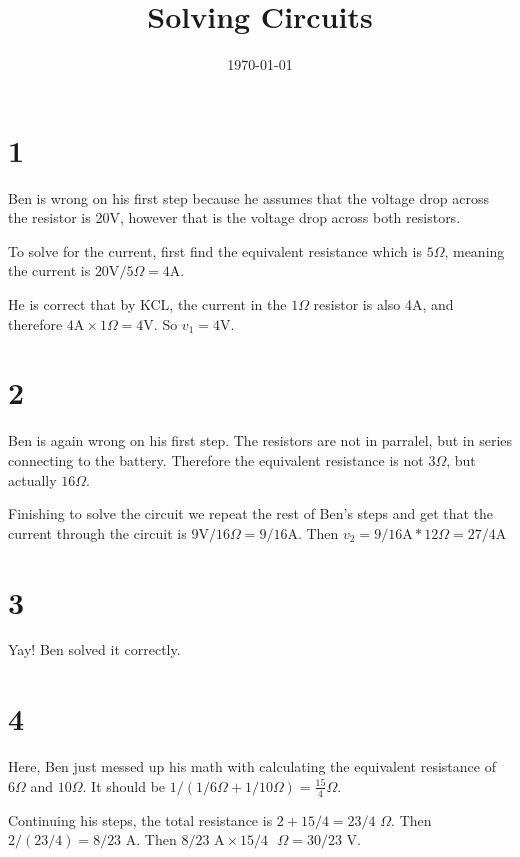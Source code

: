 \documentclass{article}
\begin{document}
\title{Solving Circuits}
\author{}
\date{\today}

\maketitle

\section*{1}

\noindent Ben is wrong on his first step because he assumes that the voltage
drop across the resistor is 20V, however that is the voltage drop
across both resistors.

\noindent To solve for the current, first find the equivalent resistance
which is $5\Omega$, meaning the current is $\text{20V}/ 5\Omega = \text{4A}$.

\noindent He is correct that by KCL, the current in the $1\Omega$ resistor is also
4A, and therefore $\text{4A}\times1\Omega=\text{4V}$. So $v_1=\text{4V}$.

\section*{2}

\noindent Ben is again wrong on his first step. The resistors are not in parralel,
but in series connecting to the battery. Therefore the equivalent resistance is not
$3\Omega$, but actually $16\Omega$.

\noindent Finishing to solve the circuit we repeat the rest of Ben's steps and get
that the current through the circuit is $\text{9V}/16\Omega=9/16\text{A}$.
Then $v_2=9/16\text{A}*12\Omega=27/4\text{A}$

\section*{3}

\noindent Yay! Ben solved it correctly.

\section*{4}

\noindent Here, Ben just messed up his math with calculating the equivalent resistance
of $6\Omega$ and $10\Omega$. It should be $1/(1/6\Omega+1/10\Omega)=\frac{15}{4}\Omega$.

\noindent Continuing his steps, the total resistance is $2+15/4=23/4$ $\Omega$. Then
$2/(23/4)=8/23\text{ A}$. Then $8/23\text{ A}\times15/4\text{ }\Omega=30/23$ V.
\end{document}
